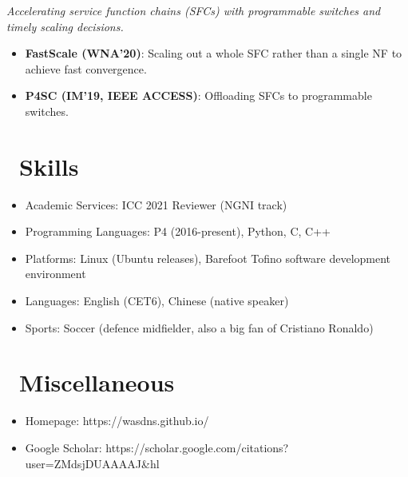 \documentclass{resume}
\begin{document}
\emph{Accelerating service function chains (SFCs) with programmable switches and timely scaling decisions.}
\begin{itemize}
  \item \textbf{FastScale (WNA'20)}: Scaling out a whole SFC rather than a single NF to achieve fast convergence. 
  \item \textbf{P4SC (IM'19, IEEE ACCESS)}: Offloading SFCs to programmable switches.
\end{itemize}


\section{\faCogs\ Skills}
\begin{itemize}[parsep=0.5ex]
  \item Academic Services: ICC 2021 Reviewer (NGNI track)
  \item Programming Languages: P4 (2016-present), Python, C, C++
  \item Platforms: Linux (Ubuntu releases), Barefoot Tofino software development environment
  \item Languages: English (CET6), Chinese (native speaker)
  \item Sports: Soccer (defence midfielder, also a big fan of Cristiano Ronaldo)
\end{itemize}


\section{\faInfo\ Miscellaneous}
\begin{itemize}[parsep=0.5ex]
  \item Homepage: https://wasdns.github.io/
  \item Google Scholar: https://scholar.google.com/citations?user=ZMdsjDUAAAAJ\&hl
\end{itemize}

%
%
\end{document}
